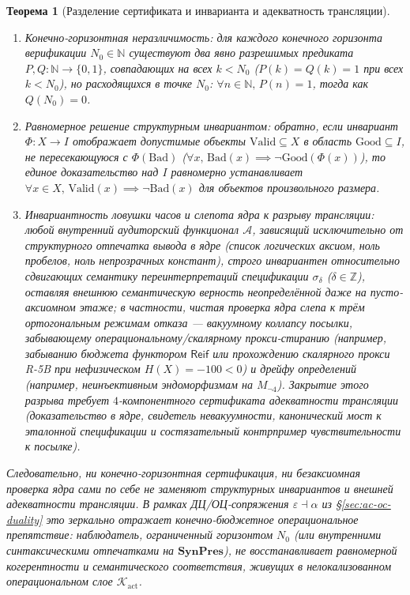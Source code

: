 \documentclass[11pt]{article}
\theoremstyle{plain}
\newtheorem{theorem}{Теорема}[section]
\theoremstyle{definition}
\begin{document}
\begin{theorem}[Разделение сертификата и инварианта и адекватность трансляции]\label{thm:cert-inv-separation}
\mbox{}
\begin{enumerate}[nosep,label=(\roman*)]
\item \emph{Конечно-горизонтная неразличимость}: для каждого конечного горизонта верификации $N_0 \in \mathbb{N}$ существуют два явно разрешимых предиката $P, Q : \mathbb{N} \to \{0,1\}$, совпадающих на всех $k < N_0$ ($P(k) = Q(k) = 1$ при всех $k < N_0$), но расходящихся в точке $N_0$: $\forall n \in \mathbb{N},\, P(n) = 1$, тогда как $Q(N_0) = 0$.
\item \emph{Равномерное решение структурным инвариантом}: обратно, если инвариант $\Phi : X \to I$ отображает допустимые объекты $\mathrm{Valid} \subseteq X$ в область $\mathrm{Good} \subseteq I$, не пересекающуюся с $\Phi(\mathrm{Bad})$ ($\forall x,\, \mathrm{Bad}(x) \implies \neg\mathrm{Good}(\Phi(x))$), то единое доказательство над $I$ равномерно устанавливает $\forall x \in X,\, \mathrm{Valid}(x) \implies \neg\mathrm{Bad}(x)$ для объектов произвольного размера.
\item \emph{Инвариантность ловушки часов и слепота ядра к разрыву трансляции}: любой внутренний аудиторский функционал $\mathcal{A}$, зависящий исключительно от структурного отпечатка вывода в ядре (список логических аксиом, ноль пробелов, ноль непрозрачных констант), строго инвариантен относительно сдвигающих семантику переинтерпретаций спецификации $\sigma_\delta$ ($\delta \in \mathbb{Z}$), оставляя внешнюю семантическую верность неопределённой даже на пусто-аксиомном этаже; в частности, чистая проверка ядра слепа к трём ортогональным режимам отказа --- вакуумному коллапсу посылки, забывающему операциональному/скалярному прокси-стиранию (например, забыванию бюджета функтором $\mathsf{Reif}$ или прохождению скалярного прокси R-5B при нефизическом $H(X) = -100 < 0$) и дрейфу определений (например, неинъективным эндоморфизмам на $M_{\neg 4}$). Закрытие этого разрыва требует $4$-компонентного \emph{сертификата адекватности трансляции} (доказательство в ядре, свидетель невакуумности, канонический мост к эталонной спецификации и состязательный контрпример чувствительности к посылке).
\end{enumerate}
Следовательно, ни конечно-горизонтная сертификация, ни безаксиомная проверка ядра сами по себе не заменяют структурных инвариантов и внешней адекватности трансляции. В рамках ДЦ/ОЦ-сопряжения $\varepsilon \dashv \alpha$ из \S\ref{sec:ac-oc-duality} это зеркально отражает конечно-бюджетное операциональное препятствие: наблюдатель, ограниченный горизонтом $N_0$ (или внутренними синтаксическими отпечатками на $\mathbf{SynPres}$), не восстанавливает равномерной когерентности и семантического соответствия, живущих в нелокализованном операциональном слое $\mathcal{K}_{\mathrm{act}}$.
\end{theorem}
\end{document}

